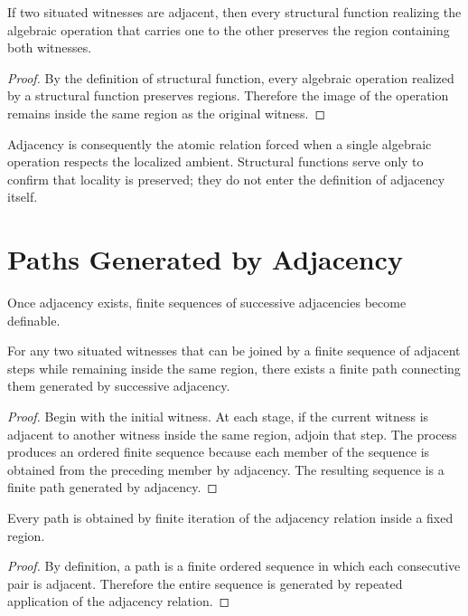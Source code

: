 \documentclass[12pt,anyside]{book}
\begin{document}
\begin{theorem}
If two situated witnesses are adjacent, then every structural function realizing the algebraic operation that carries one to the other preserves the region containing both witnesses.
\end{theorem}

\begin{proof}
By the definition of structural function, every algebraic operation realized by a structural function preserves regions. Therefore the image of the operation remains inside the same region as the original witness.
\end{proof}

Adjacency is consequently the atomic relation forced when a single algebraic operation respects the localized ambient. Structural functions serve only to confirm that locality is preserved; they do not enter the definition of adjacency itself.

\section{Paths Generated by Adjacency}
Once adjacency exists, finite sequences of successive adjacencies become definable.

\begin{theorem}
For any two situated witnesses that can be joined by a finite sequence of adjacent steps while remaining inside the same region, there exists a finite path connecting them generated by successive adjacency.
\end{theorem}

\begin{proof}
Begin with the initial witness. At each stage, if the current witness is adjacent to another witness inside the same region, adjoin that step. The process produces an ordered finite sequence because each member of the sequence is obtained from the preceding member by adjacency. The resulting sequence is a finite path generated by adjacency.
\end{proof}

\begin{theorem}
Every path is obtained by finite iteration of the adjacency relation inside a fixed region.
\end{theorem}

\begin{proof}
By definition, a path is a finite ordered sequence in which each consecutive pair is adjacent. Therefore the entire sequence is generated by repeated application of the adjacency relation.
\end{proof}
\end{document}
